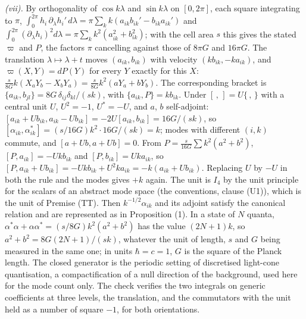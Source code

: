 \emph{(vii).} By orthogonality of $\cos k\lambda$ and $\sin k\lambda$ on $[0, 2\pi]$, each square integrating to $\pi$, $\int_{0}^{2\pi}h_{i}\,\partial_{\lambda}h_{i}'\,d\lambda = \pi\sum_{k}k(a_{ik}b_{ik}' - b_{ik}a_{ik}')$ and $\int_{0}^{2\pi}(\partial_{\lambda}h_{i})^{2}d\lambda = \pi\sum_{k}k^{2}(a_{ik}^{2} + b_{ik}^{2})$; with the cell area $s$ this gives the stated $\varpi$ and $P$, the factors $\pi$ cancelling against those of $8\pi G$ and $16\pi G$. The translation $\lambda \mapsto \lambda + t$ moves $(a_{ik}, b_{ik})$ with velocity $(kb_{ik}, -ka_{ik})$, and $\varpi(X, Y) = dP(Y)$ for every $Y$ exactly for this $X$: $\tfrac{s}{8G}k(X_{a}Y_{b} - X_{b}Y_{a}) = \tfrac{s}{8G}k^{2}(aY_{a} + bY_{b})$. The corresponding bracket is $\{a_{ik}, b_{jl}\} = 8G\,\delta_{ij}\delta_{kl}/(sk)$, with $\{a_{ik}, P\} = kb_{ik}$. Under $[\,,\,] = U\{\,,\,\}$ with a central unit $U$, $U^{2} = -1$, $U^{*} = -U$, and $a$, $b$ self-adjoint: $[a_{ik} + Ub_{ik}, a_{ik} - Ub_{ik}] = -2U[a_{ik}, b_{ik}] = 16G/(sk)$, so $[\alpha_{ik}, \alpha_{ik}^{*}] = (s/16G)k^{2} \cdot 16G/(sk) = k$; modes with different $(i, k)$ commute, and $[a + Ub, a + Ub] = 0$. From $P = \tfrac{s}{16G}\sum k^{2}(a^{2} + b^{2})$, $[P, a_{ik}] = -Ukb_{ik}$ and $[P, b_{ik}] = Uka_{ik}$, so $[P, a_{ik} + Ub_{ik}] = -Ukb_{ik} + U^{2}ka_{ik} = -k(a_{ik} + Ub_{ik})$. Replacing $U$ by $-U$ in both the rule and the modes gives $+k$ again. The unit is $I_{4}$ by the unit principle for the scalars of an abstract mode space (the conventions, clause (U1)), which is the unit of Premise (TT). Then $k^{-1/2}\alpha_{ik}$ and its adjoint satisfy the canonical relation and are represented as in Proposition (1). In a state of $N$ quanta, $\alpha^{*}\alpha + \alpha\alpha^{*} = (s/8G)k^{2}(a^{2} + b^{2})$ has the value $(2N + 1)k$, so $a^{2} + b^{2} = 8G(2N + 1)/(sk)$, whatever the unit of length, $s$ and $G$ being measured in the same one; in units $\hbar = c = 1$, $G$ is the square of the Planck length. The closed generator is the periodic setting of discretised light-cone quantisation, a compactification of a null direction of the background, used here for the mode count only. The check verifies the two integrals on generic coefficients at three levels, the translation, and the commutators with the unit held as a number of square $-1$, for both orientations.

